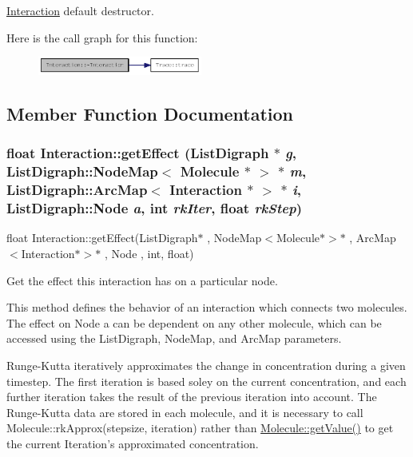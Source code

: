 \hyperlink{classInteraction}{Interaction} default destructor. 

Here is the call graph for this function:\nopagebreak
\begin{figure}[H]
\begin{center}
\leavevmode
\includegraphics[width=153pt]{classInteraction_a6610199fedc7fae617003cb2f397c825_cgraph}
\end{center}
\end{figure}


\subsection{Member Function Documentation}
\hypertarget{classInteraction_a6328831e714adf9c8177f6052d2e017f}{
\subsubsection[{getEffect}]{\setlength{\rightskip}{0pt plus 5cm}float Interaction::getEffect (ListDigraph $\ast$ {\em g}, \/  ListDigraph::NodeMap$<$ {\bf Molecule} $\ast$ $>$ $\ast$ {\em m}, \/  ListDigraph::ArcMap$<$ {\bf Interaction} $\ast$ $>$ $\ast$ {\em i}, \/  ListDigraph::Node {\em a}, \/  int {\em rkIter}, \/  float {\em rkStep})}}
\label{classInteraction_a6328831e714adf9c8177f6052d2e017f}
float Interaction::getEffect(ListDigraph$\ast$ , NodeMap$<$Molecule$\ast$$>$$\ast$ , ArcMap$<$Interaction$\ast$$>$$\ast$ , Node , int, float)

Get the effect this interaction has on a particular node.

This method defines the behavior of an interaction which connects two molecules. The effect on Node a can be dependent on any other molecule, which can be accessed using the ListDigraph, NodeMap, and ArcMap parameters.

Runge-\/Kutta iteratively approximates the change in concentration during a given timestep. The first iteration is based soley on the current concentration, and each further iteration takes the result of the previous iteration into account. The Runge-\/Kutta data are stored in each molecule, and it is necessary to call Molecule::rkApprox(stepsize, iteration) rather than \hyperlink{classMolecule_a554ea822918374775d5f52b5d49d8195}{Molecule::getValue()} to get the current Iteration's approximated concentration.


